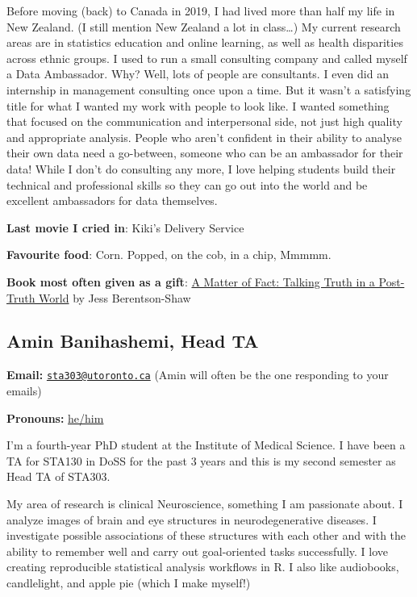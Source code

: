\documentclass[
  openany]{book}
\begin{document}
Before moving (back) to Canada in 2019, I had lived more than half my life in New Zealand. (I still mention New Zealand a lot in class\ldots) My current research areas are in statistics education and online learning, as well as health disparities across ethnic groups. I used to run a small consulting company and called myself a Data Ambassador. Why? Well, lots of people are consultants. I even did an internship in management consulting once upon a time. But it wasn't a satisfying title for what I wanted my work with people to look like. I wanted something that focused on the communication and interpersonal side, not just high quality and appropriate analysis. People who aren't confident in their ability to analyse their own data need a go-between, someone who can be an ambassador for their data! While I don't do consulting any more, I love helping students build their technical and professional skills so they can go out into the world and be excellent ambassadors for data themselves.

\textbf{Last movie I cried in}: Kiki's Delivery Service

\textbf{Favourite food}: Corn. Popped, on the cob, in a chip, Mmmmm.

\textbf{Book most often given as a gift}: \href{https://www.goodreads.com/book/show/41123067-a-matter-of-fact}{A Matter of Fact: Talking Truth in a Post-Truth World} by Jess Berentson-Shaw

\hypertarget{amin-banihashemi-head-ta}{%
\subsection{Amin Banihashemi, Head TA}\label{amin-banihashemi-head-ta}}

\textbf{Email:} \href{mailto:sta303@utoronto.ca}{\nolinkurl{sta303@utoronto.ca}} (Amin will often be the one responding to your emails)

\textbf{Pronouns:} \href{https://www.mypronouns.org/he-him}{he/him}

I'm a fourth-year PhD student at the Institute of Medical Science. I have been a TA for STA130 in DoSS for the past 3 years and this is my second semester as Head TA of STA303.

My area of research is clinical Neuroscience, something I am passionate about. I analyze images of brain and eye structures in neurodegenerative diseases. I investigate possible associations of these structures with each other and with the ability to remember well and carry out goal-oriented tasks successfully. I love creating reproducible statistical analysis workflows in R. I also like audiobooks, candlelight, and apple pie (which I make myself!)
\end{document}
